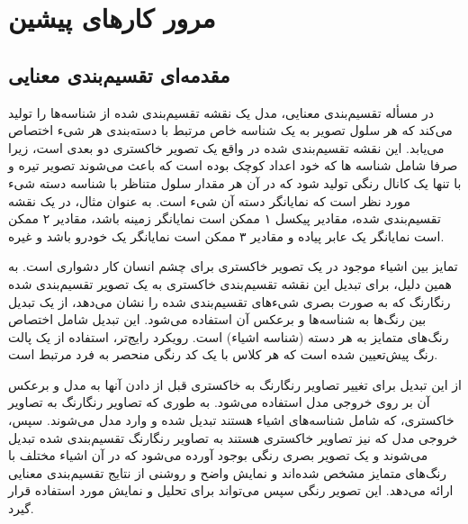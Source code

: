 \chapter{مرور کار‌های پیشین}

\section{مقدمه‌ای تقسیم‌بندی معنایی}

در مسأله تقسیم‌بندی معنایی، مدل یک نقشه تقسیم‌بندی شده
از شناسه‌ها
را تولید می‌کند که هر سلول تصویر به یک شناسه خاص مرتبط با دسته‌بندی هر شیء اختصاص می‌یابد. این نقشه تقسیم‌بندی شده در واقع یک تصویر خاکستری دو بعدی
است، زیرا صرفا شامل شناسه ها که خود اعداد کوچک بوده است که باعث می‌شوند تصویر تیره و با تنها یک کانال رنگی تولید شود که در آن هر مقدار سلول متناظر با شناسه دسته شیء مورد نظر است که نمایانگر دسته آن شیء است. به عنوان مثال، در یک نقشه تقسیم‌بندی شده، مقادیر پیکسل ۱ ممکن است نمایانگر زمینه باشد، مقادیر ۲ ممکن است نمایانگر یک عابر پیاده و مقادیر ۳ ممکن است نمایانگر یک خودرو باشد و غیره.

تمایز بین اشیاء موجود در یک تصویر خاکستری برای چشم انسان کار دشواری است. به همین دلیل، برای تبدیل این نقشه تقسیم‌بندی خاکستری به یک تصویر تقسیم‌بندی شده رنگارنگ
که به صورت بصری شیء‌های تقسیم‌بندی شده را نشان می‌دهد، از یک تبدیل بین رنگ‌ها به شناسه‌ها و برعکس آن استفاده می‌شود. این تبدیل شامل اختصاص رنگ‌های متمایز به هر دسته (شناسه اشیاء) است. رویکرد رایج‌تر، استفاده از یک پالت رنگ
پیش‌تعیین شده است که هر کلاس با یک کد رنگی
منحصر به فرد مرتبط است.

از این تبدیل برای تغییر تصاویر رنگارنگ به خاکستری قبل از دادن آنها به مدل و برعکس آن بر روی خروجی مدل استفاده می‌شود. به طوری که تصاویر رنگارنگ به تصاویر خاکستری، که شامل شناسه‌های اشیاء هستند تبدیل شده و وارد مدل می‌شوند. سپس، خروجی مدل که نیز تصاویر خاکستری هستند به تصاویر رنگارنگ تقسیم‌بندی شده تبدیل می‌شوند و یک تصویر بصری رنگی بوجود آورده می‌شود که در آن اشیاء مختلف با رنگ‌های متمایز مشخص شده‌اند و نمایش واضح و روشنی از نتایج تقسیم‌بندی معنایی ارائه می‌دهد. این تصویر رنگی سپس می‌تواند برای تحلیل و نمایش مورد استفاده قرار گیرد.

